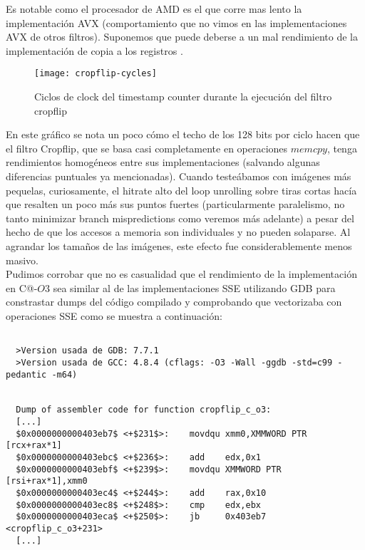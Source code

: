 Es notable como el procesador de AMD es el que corre mas lento la implementación AVX (comportamiento que no vimos en las implementaciones AVX de otros filtros). Suponemos que puede deberse a un mal rendimiento de la implementación de copia a los registros \ymm{}.

\begin{figure}[H]
\centering
\texttt{[image: cropflip-cycles]}
\label{fig:cropflip-cycles}
\caption{Ciclos de clock del timestamp counter durante la ejecución del filtro cropflip}
\end{figure}

En este gráfico se nota un poco cómo el techo de los 128 bits por ciclo hacen que el filtro Cropflip, que se basa casi completamente en operaciones $memcpy$, tenga rendimientos homogéneos entre sus implementaciones (salvando algunas diferencias puntuales ya mencionadas). Cuando testeábamos con imágenes más pequelas, curiosamente, el hitrate alto del loop unrolling sobre tiras cortas hacía que resalten un poco más sus puntos fuertes (particularmente paralelismo, no tanto minimizar branch mispredictions como veremos más adelante) a pesar del hecho de que los accesos a memoria son individuales y no pueden solaparse. Al agrandar los tamaños de las imágenes, este efecto fue considerablemente menos masivo.
\\

Pudimos corrobar que no es casualidad que el rendimiento de la implementación en C@-$O3$ sea similar al de las implementaciones SSE utilizando GDB para constrastar dumps del código compilado y comprobando que vectorizaba con operaciones SSE como se muestra a continuación:
\\

\begin{lstlisting}

  >Version usada de GDB: 7.7.1
  >Version usada de GCC: 4.8.4 (cflags: -O3 -Wall -ggdb -std=c99 -pedantic -m64)


  Dump of assembler code for function cropflip_c_o3:
  [...]
  $0x0000000000403eb7$ <+$231$>:	movdqu xmm0,XMMWORD PTR [rcx+rax*1]
  $0x0000000000403ebc$ <+$236$>:	add    edx,0x1
  $0x0000000000403ebf$ <+$239$>:	movdqu XMMWORD PTR [rsi+rax*1],xmm0
  $0x0000000000403ec4$ <+$244$>:	add    rax,0x10
  $0x0000000000403ec8$ <+$248$>:	cmp    edx,ebx
  $0x0000000000403eca$ <+$250$>:	jb     0x403eb7 <cropflip_c_o3+231>
  [...]

\end{lstlisting}

